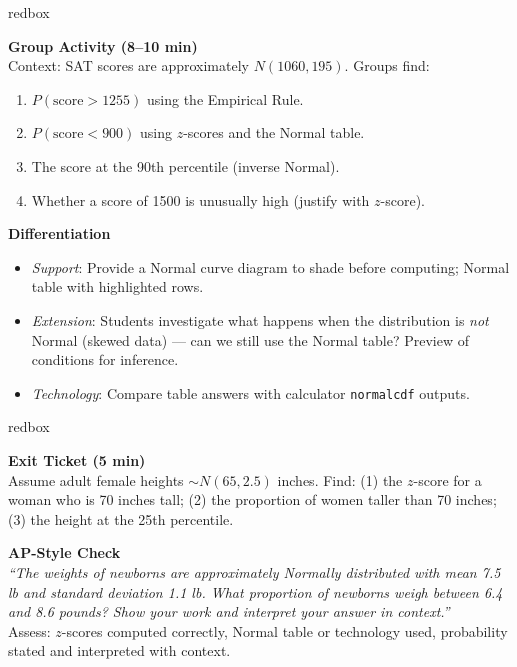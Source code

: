 \documentclass[10pt]{article}
\begin{document}
\boxguard
\begin{skillbox}{redbox}
\begin{minipage}[t]{0.48\linewidth}
    \textbf{Group Activity (8--10 min)}\\
    Context: SAT scores are approximately $N(1060, 195)$. Groups find:
    \begin{enumerate}
        \item $P(\text{score} > 1255)$ using the Empirical Rule.
        \item $P(\text{score} < 900)$ using $z$-scores and the Normal table.
        \item The score at the 90th percentile (inverse Normal).
        \item Whether a score of 1500 is unusually high (justify with $z$-score).
    \end{enumerate}
\end{minipage}
\hfill
\begin{minipage}[t]{0.48\linewidth}
    \textbf{Differentiation}
    \begin{itemize}
        \item \textit{Support}: Provide a Normal curve diagram to shade before computing; Normal table with highlighted rows.
        \item \textit{Extension}: Students investigate what happens when the distribution is \textit{not} Normal (skewed data) --- can we still use the Normal table? Preview of conditions for inference.
        \item \textit{Technology}: Compare table answers with calculator \texttt{normalcdf} outputs.
    \end{itemize}
\end{minipage}
\end{skillbox}

\boxguard
\begin{skillbox}{redbox}
\begin{minipage}[t]{0.48\linewidth}
    \textbf{Exit Ticket (5 min)}\\
    Assume adult female heights $\sim N(65, 2.5)$ inches. Find: (1) the $z$-score for a woman who is 70 inches tall; (2) the proportion of women taller than 70 inches; (3) the height at the 25th percentile.
\end{minipage}
\hfill
\begin{minipage}[t]{0.48\linewidth}
    \textbf{AP-Style Check}\\
    \textit{``The weights of newborns are approximately Normally distributed with mean 7.5 lb and standard deviation 1.1 lb. What proportion of newborns weigh between 6.4 and 8.6 pounds? Show your work and interpret your answer in context.''}\\[4pt]
    Assess: $z$-scores computed correctly, Normal table or technology used, probability stated and interpreted with context.
\end{minipage}
\end{skillbox}
\end{document}
